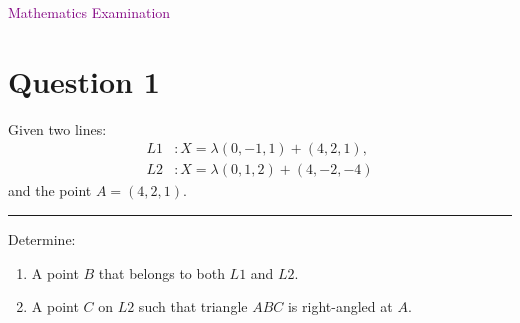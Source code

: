 \documentclass[12pt,a4paper]{article}
\begin{document}
	
	\begin{center}
		\colorbox{gray!20}{
			\parbox{0.7\textwidth}{
				\centering \Huge \textcolor{purple}{Mathematics Examination}
			}
		}
	\end{center}
	\vspace{10mm}
	
	\section*{Question 1}
	
	Given two lines:
	\begin{align*}
		L1 &: X = \lambda(0,-1,1) + (4,2,1), \\
		L2 &: X = \lambda(0,1,2) + (4,-2,-4)
	\end{align*}
	\vspace{5mm}
	\noindent and the point \( A = (4,2,1) \).
	
	\vspace{5mm}
	\textcolor{purple}{\rule{\linewidth}{0.5mm}}
	Determine:
	\begin{enumerate}[label=\textcolor{purple}{\arabic*}.]
		\item A point \( B \) that belongs to both \( L1 \) and \( L2 \).
		\item A point \( C \) on \( L2 \) such that triangle \( ABC \) is right-angled at \( A \).
	\end{enumerate}
	
\end{document}

